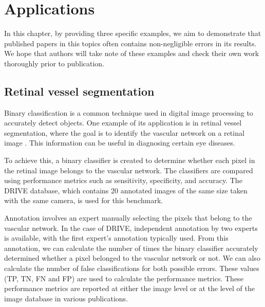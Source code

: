 \documentclass[5p, final]{elsarticle}
\begin{document}


\section{Applications}
\label{sec:applications}
In this chapter, by providing three specific examples, we aim to demonstrate that published papers in this topics often contains non-negligible errors in its results. We hope that authors will take note of these examples and check their own work thoroughly prior to publication.

\subsection{Retinal vessel segmentation}
Binary classification is a common technique used in digital image processing to accurately detect objects. One example of its application is in retinal vessel segmentation, where the goal is to identify the vascular network on a retinal image \cite{8}. This information can be useful in diagnosing certain eye diseases.

To achieve this, a binary classifier is created to determine whether each pixel in the retinal image belongs to the vascular network. The classifiers are compared using performance metrics such as sensitivity, specificity, and accuracy. The DRIVE database, which contains 20 annotated images of the same size taken with the same camera, is used for this benchmark.

Annotation involves an expert manually selecting the pixels that belong to the vascular network. In the case of DRIVE, independent annotation by two experts is available, with the first expert’s annotation typically used. From this annotation, we can calculate the number of times the binary classifier accurately determined whether a pixel belonged to the vascular network or not. We can also calculate the number of false classifications for both possible errors. These values (TP, TN, FN and FP) are used to calculate the performance metrics. These performance metrics are reported at either the image level or at the level of the image database in various publications.
\end{document}
